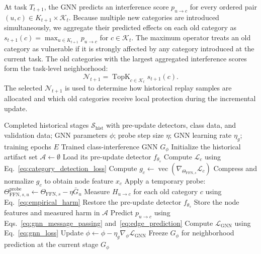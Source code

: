 At task $T_{t+1}$, the GNN predicts an interference score $p_{u\rightarrow c}$
for every ordered pair $(u,c)\in K_{t+1}\times\mathcal{K}_t$.
Because multiple new categories are introduced simultaneously, we aggregate
their predicted effects on each old category as
$s_{t+1}(c)=\max_{u\in K_{t+1}}p_{u\rightarrow c}$ for
$c\in\mathcal{K}_t$. The maximum operator treats an old category as vulnerable
if it is strongly affected by any category introduced at the current task.
The old categories with the largest aggregated interference scores form the
task-level neighborhood:
\begin{equation}
\mathcal{N}_{t+1}
=\operatorname{TopK}_{c\in\mathcal{K}_t}s_{t+1}(c).
\label{eq:interference_neighborhood}
\end{equation}
The selected $\mathcal{N}_{t+1}$ is used to determine how historical replay
samples are allocated and which old categories receive local protection during
the incremental update.

\begin{algorithm}[t]
\caption{Training the Class-Interference GNN}
\label{alg:gnn_training}
\begin{algorithmic}[1]
\renewcommand{\algorithmicrequire}{\textbf{Input:}}
\renewcommand{\algorithmicensure}{\textbf{Output:}}
\Require Completed historical stages $\mathcal{S}_{\mathrm{hist}}$ with
pre-update detectors, class data, and validation data; GNN parameters $\phi$;
probe step size $\eta$; GNN learning rate $\eta_g$; training epochs $E$
\Ensure Trained class-interference GNN $G_\phi$
\State Initialize the historical artifact set $\mathcal{A}\gets\emptyset$
    \State Load its pre-update detector $f_{\theta_s}$
        \State Compute $\mathcal{L}_c$ using Eq.~\ref{eq:category_detection_loss}
        \State Compute $g_c\gets\operatorname{vec}(\nabla_{\Theta_{\mathrm{FFN},s}}\mathcal{L}_c)$
        \State Compress and normalize $g_c$ to obtain node feature $x_c$
    \EndFor
        \State Apply a temporary probe:
        $\Theta_{\mathrm{FFN},s,u}^{\mathrm{probe}}
        \gets\Theta_{\mathrm{FFN},s}-\eta\bar{G}_u$
        \State Measure $H_{u\rightarrow c}$ for each old category $c$
        using Eq.~\ref{eq:empirical_harm}
        \State Restore the pre-update detector $f_{\theta_s}$
    \EndFor
    \State Store the node features and measured harm in $\mathcal{A}$
\EndFor
{}
        \State Predict $p_{u\rightarrow c}$ using
        Eqs.~\ref{eq:gnn_message_passing} and~\ref{eq:edge_prediction}
        \State Compute $\mathcal{L}_{\mathrm{GNN}}$ using Eq.~\ref{eq:gnn_loss}
        \State Update $\phi\gets\phi-\eta_g\nabla_\phi\mathcal{L}_{\mathrm{GNN}}$
    \EndFor
\EndFor
\State Freeze $G_\phi$ for neighborhood prediction at the current stage
\State \Return $G_\phi$
\end{algorithmic}
\end{algorithm}

